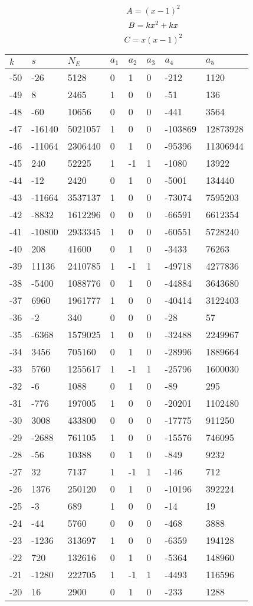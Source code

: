 \documentclass{amsart}
\begin{document}
$$A=(x
 - 1)^{2}$$
$$B=k\*x^2
 + k\*x$$
$$C=x(x
 - 1)^{2}$$
\begin{longtable}{|l|l|l|lllll|}
\hline
$k$ & $s$ & $N_E$ & $a_1$ & $a_2$ & $a_3$ & $a_4$ & $a_5$\\
\hline
-50&-26&5128&0&1&0&-212&1120\\
-49&8&2465&1&0&0&-51&136\\
-48&-60&10656&0&0&0&-441&3564\\
-47&-16140&5021057&1&0&0&-103869&12873928\\
-46&-11064&2306440&0&1&0&-95396&11306944\\
-45&240&52225&1&-1&1&-1080&13922\\
-44&-12&2420&0&1&0&-5001&134440\\
-43&-11664&3537137&1&0&0&-73074&7595203\\
-42&-8832&1612296&0&0&0&-66591&6612354\\
-41&-10800&2933345&1&0&0&-60551&5728240\\
-40&208&41600&0&1&0&-3433&76263\\
-39&11136&2410785&1&-1&1&-49718&4277836\\
-38&-5400&1088776&0&1&0&-44884&3643680\\
-37&6960&1961777&1&0&0&-40414&3122403\\
-36&-2&340&0&0&0&-28&57\\
-35&-6368&1579025&1&0&0&-32488&2249967\\
-34&3456&705160&0&1&0&-28996&1889664\\
-33&5760&1255617&1&-1&1&-25796&1600030\\
-32&-6&1088&0&1&0&-89&295\\
-31&-776&197005&1&0&0&-20201&1102480\\
-30&3008&433800&0&0&0&-17775&911250\\
-29&-2688&761105&1&0&0&-15576&746095\\
-28&-56&10388&0&1&0&-849&9232\\
-27&32&7137&1&-1&1&-146&712\\
-26&1376&250120&0&1&0&-10196&392224\\
-25&-3&689&1&0&0&-14&19\\
-24&-44&5760&0&0&0&-468&3888\\
-23&-1236&313697&1&0&0&-6359&194128\\
-22&720&132616&0&1&0&-5364&148960\\
-21&-1280&222705&1&-1&1&-4493&116596\\
-20&16&2900&0&1&0&-233&1288\\

\end{longtable}
\end{document}
